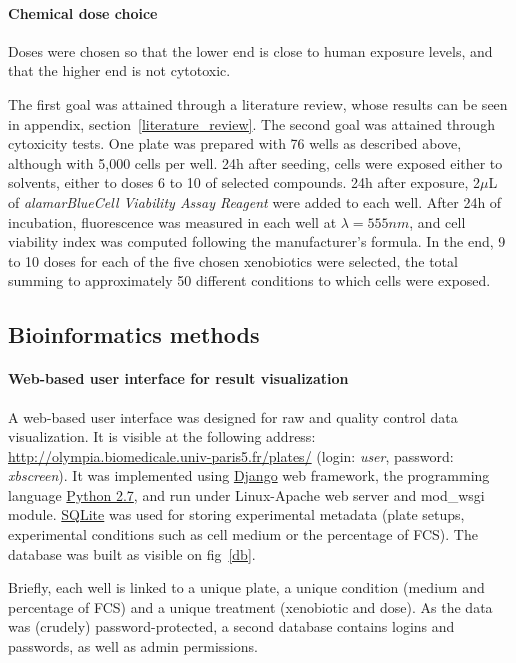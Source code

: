 \paragraph{Chemical dose choice}
Doses were chosen so that the lower end is close to human exposure levels, and that the higher end is not cytotoxic.

The first goal was attained through a literature review, whose results can be seen in appendix, section~\ref{literature_review}. The second goal was attained through cytoxicity tests. One plate was prepared with 76 wells as described above, although with 5,000 cells per well. 24h after seeding, cells were exposed either to solvents, either to doses 6 to 10 of selected compounds. 24h after exposure, 2$\mu$L of \textit{alamarBlue\texttrademark Cell Viability Assay Reagent} were added to each well. After 24h of incubation, fluorescence was measured in each well at $\lambda = 555nm$, and cell viability index was computed following the manufacturer's formula. In the end, 9 to 10 doses for each of the five chosen xenobiotics were selected, the total summing to approximately 50 different conditions to which cells were exposed.

\subsection{Bioinformatics methods}
\label{interface}
\paragraph{Web-based user interface for result visualization}  A web-based user interface was designed for raw  and quality control data visualization. It is visible at the following address: \href{http://olympia.biomedicale.univ-paris5.fr/plates/}{http://olympia.biomedicale.univ-paris5.fr/plates/} (login: \textit{user}, password: \textit{xbscreen}). It was implemented using \href{https://www.djangoproject.com/}{Django} web framework, the programming language \href{http://www.python.org}{Python 2.7}, and run under Linux-Apache web server and mod\_wsgi module. \href{https://sqlite.org/}{SQLite} was used for storing experimental metadata (plate setups, experimental conditions such as cell medium or the percentage of FCS). The database was built as visible on fig~\ref{db}.

Briefly, each well is linked to a unique plate, a unique condition (medium and percentage of FCS) and a unique treatment (xenobiotic and dose). As the data was (crudely) password-protected, a second database contains logins and passwords, as well as admin permissions.

